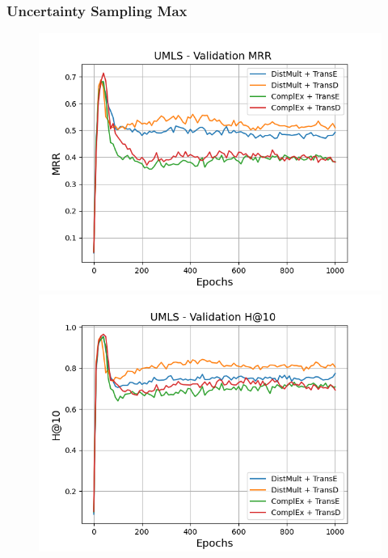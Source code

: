 \subsubsection{Uncertainty Sampling Max}
\begin{figure}[H]
    \centering
    \begin{minipage}{.45\textwidth}
      \centering
      \includegraphics[width=0.9\linewidth]{figures/results/gan_train/not_pretrained/uncertainty/max/entropy/umls/1k_epochs/uncertainty_umls_mrrs.png}
    \end{minipage}%
    \begin{minipage}{.45\textwidth}
      \centering
      \includegraphics[width=0.9\linewidth]{figures/results/gan_train/not_pretrained/uncertainty/max/entropy/umls/1k_epochs/uncertainty_umls_hit10.png}
    \end{minipage}
    

\end{figure}

